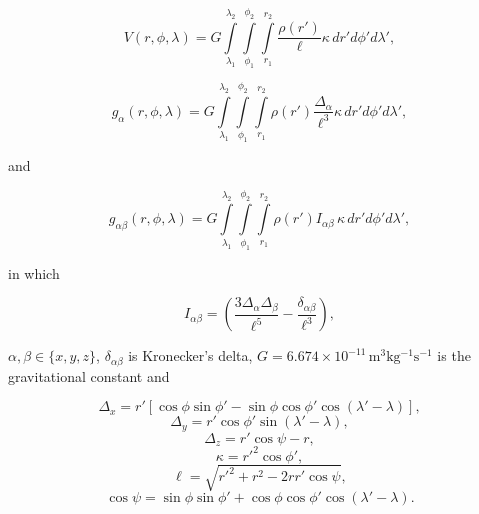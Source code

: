 \documentclass[extra, referee]{gji}
\begin{document}
\begin{equation}
    V(r,\phi,\lambda) = G
    \int\limits_{\lambda_1}^{\lambda_2}
    \int\limits_{\phi_1}^{\phi_2}
    \int\limits_{r_1}^{r_2}
    \frac{\rho(r')}{\ell} \kappa \,  dr' d\phi' d\lambda',
\label{eq:tesseroid-pot}
\end{equation}

\begin{equation}
    g_{\alpha}(r,\phi,\lambda) = G
    \int\limits_{\lambda_1}^{\lambda_2}
    \int\limits_{\phi_1}^{\phi_2}
    \int\limits_{r_1}^{r_2}
    \rho(r') \frac{\Delta_\alpha}{\ell^3}
    \kappa \, dr' d\phi' d\lambda',
\label{eq:tesseroid-grav}
\end{equation}

\noindent and

\begin{equation}
    g_{\alpha\beta}(r,\phi,\lambda) = G
    \int\limits_{\lambda_1}^{\lambda_2}
    \int\limits_{\phi_1}^{\phi_2}
    \int\limits_{r_1}^{r_2}
    \rho(r') I_{\alpha\beta} \, \kappa \, dr' d\phi' d\lambda' ,
    \label{eq:tesseroid-tensor}
\end{equation}

\noindent in which

\begin{equation}
    I_{\alpha\beta} =
    \left(
        \frac{3\Delta_{\alpha} \Delta_{\beta}}{\ell^5} -
        \frac{\delta_{\alpha\beta}}{\ell^3}
    \right) ,
    \label{eq:tesseroid-tensor-kernel}
\end{equation}

\noindent $\alpha, \beta \in \{x, y, z\}$, $\delta_{\alpha\beta}$ is Kronecker's delta,
$G = 6.674\times10^{-11}\, \text{m$^3$kg$^{-1}$s$^{-1}$}$ is the gravitational constant
and

\begin{equation}
    \Delta_x = r'[\cos\phi\sin\phi' - \sin\phi\cos\phi'
               \cos(\lambda' - \lambda)],
\end{equation}
\begin{equation}
    \Delta_y = r' \cos \phi' \sin(\lambda' - \lambda),
\end{equation}
\begin{equation}
    \Delta_z = r' \cos \psi - r,
\end{equation}
\begin{equation}
    \kappa = {r'}^2 \cos \phi',
\end{equation}
\begin{equation}
    \ell = \sqrt{{r'}^2 + r^2 - 2 r r' \cos \psi},
\label{eq:ell}
\end{equation}
\begin{equation}
    \cos\psi = \sin\phi\sin\phi' + \cos\phi\cos\phi'
                 \cos(\lambda' - \lambda).
\label{eq:cospsi}
\end{equation}
\end{document}
